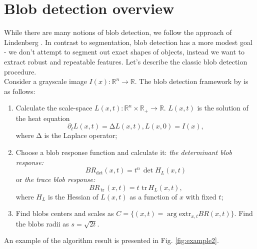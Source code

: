 \documentclass[twocolumn]{svjour3}          %
\newcommand{\R}{\mathbb{R}}
\newcommand{\Rn}{{\mathbb{R}}^n}
\newcommand{\Laplace}{\mathrm{\Delta}}
\newcommand{\partderiv}[2]{\partial_{#2} {#1}}
\newcommand{\toreal}{\rightarrow\R}
\newcommand {\tr}{{\,}\mathrm{tr}{\,}}
\begin{document}
\section{Blob detection overview}
While there are many notions of blob detection, we follow the approach of Lindenberg \cite{blob}. In contrast to segmentation, blob detection has a more modest goal - we don't attempt to segment out exact shapes of objects, instead we want to extract robust and repeatable features. Let's describe the classic blob detection procedure.
\\
Consider a grayscale image $I(x):\Rn \toreal$. The blob detection framework by \cite{blob} is as follows:
\begin{enumerate} 
\item Calculate the scale-space $L(x,t):\Rn\times \R_{+} \toreal$. $L(x,t)$ is the solution of the heat equation 
 \begin{equation}\partderiv{L(x, t)}{t}=\Laplace L(x, t),L(x, 0)=I(x), \end{equation} where $\Laplace$ is the Laplace operator;
\item Choose a blob response function and calculate it: 
\textit{ the determinant blob response: } 
\begin{equation} BR_{\det}(x, t)=t^n\,\det{H_L(x,t)}\label{blob_det}\end{equation} 
\textrm{  or } \textit{ the trace blob response: } 
\begin{equation} BR_{\tr}(x, t)=t\,\tr {H_L(x,t)}, \label{blob_tr}											\end{equation} 
 where $H_L$ is the Hessian of $L(x, t)$ as a function of $x$ with fixed $t$;
\item Find blobs centers and scales as $C=\{(x, t)=\arg \textrm{extr}_{x,t} BR(x, t)\}$. Find the blobs radii as $s=\sqrt{2 t}$.
\end{enumerate}
An example of the algorithm result is presented in Fig. \ref{fig:example2}.
\end{document}
